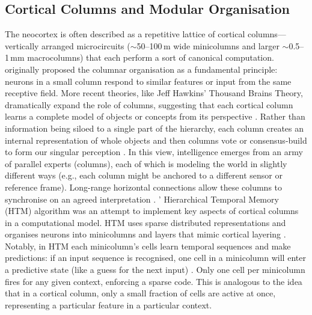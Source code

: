 \subsection{Cortical Columns and Modular Organisation}
The neocortex is often described as a repetitive lattice of cortical columns---vertically arranged microcircuits ($\sim$50--100\,\textmu{}m wide minicolumns and larger $\sim$0.5--1\,mm macrocolumns) that each perform a sort of canonical computation.
\citet{mountcastle1997columnar} originally proposed the columnar organisation as a fundamental principle: neurons in a small column respond to similar features or input from the same receptive field.
More recent theories, like Jeff Hawkins’ Thousand Brains Theory, dramatically expand the role of columns, suggesting that each cortical column learns a complete model of objects or concepts from its perspective \citep{hawkins2011htm}.
Rather than information being siloed to a single part of the hierarchy, each column creates an internal representation of whole objects and then columns vote or consensus-build to form our singular perception \citep{hawkins2011htm}.
In this view, intelligence emerges from an army of parallel experts (columns), each of which is modeling the world in slightly different ways (e.g., each column might be anchored to a different sensor or reference frame).
Long-range horizontal connections allow these columns to synchronise on an agreed interpretation \citep{hawkins2011htm}.
\citeauthor{hawkins2011htm}' Hierarchical Temporal Memory (HTM) algorithm was an attempt to implement key aspects of cortical columns in a computational model.
HTM uses sparse distributed representations and organises neurons into minicolumns and layers that mimic cortical layering \citep{hawkins2011htm}.
Notably, in HTM each minicolumn’s cells learn temporal sequences and make predictions: if an input sequence is recognised, one cell in a minicolumn will enter a predictive state (like a guess for the next input) \citep{hawkins2011htm}.
Only one cell per minicolumn fires for any given context, enforcing a sparse code.
This is analogous to the idea that in a cortical column, only a small fraction of cells are active at once, representing a particular feature in a particular context.

